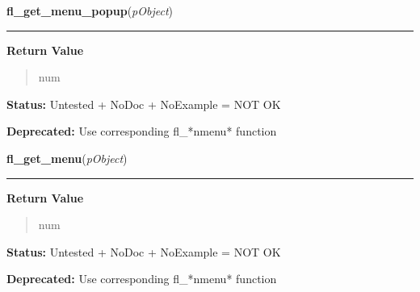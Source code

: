     \label{xformslib:deprecated:fl_get_menu_popup}

    \vspace{0.5ex}

\hspace{.8\funcindent}\begin{boxedminipage}{\funcwidth}

    \raggedright \textbf{fl\_get\_menu\_popup}(\textit{pObject})

    \vspace{-1.5ex}

    \rule{\textwidth}{0.5\fboxrule}
\setlength{\parskip}{2ex}
\setlength{\parskip}{1ex}
      \textbf{Return Value}
    \vspace{-1ex}

      \begin{quote}
      num

      \end{quote}

\textbf{Status:} Untested + NoDoc + NoExample = NOT OK



\textbf{Deprecated:} Use corresponding fl\_*nmenu* function



    \end{boxedminipage}

    \label{xformslib:deprecated:fl_get_menu}

    \vspace{0.5ex}

\hspace{.8\funcindent}\begin{boxedminipage}{\funcwidth}

    \raggedright \textbf{fl\_get\_menu}(\textit{pObject})

    \vspace{-1.5ex}

    \rule{\textwidth}{0.5\fboxrule}
\setlength{\parskip}{2ex}
\setlength{\parskip}{1ex}
      \textbf{Return Value}
    \vspace{-1ex}

      \begin{quote}
      num

      \end{quote}

\textbf{Status:} Untested + NoDoc + NoExample = NOT OK



\textbf{Deprecated:} Use corresponding fl\_*nmenu* function



    \end{boxedminipage}


